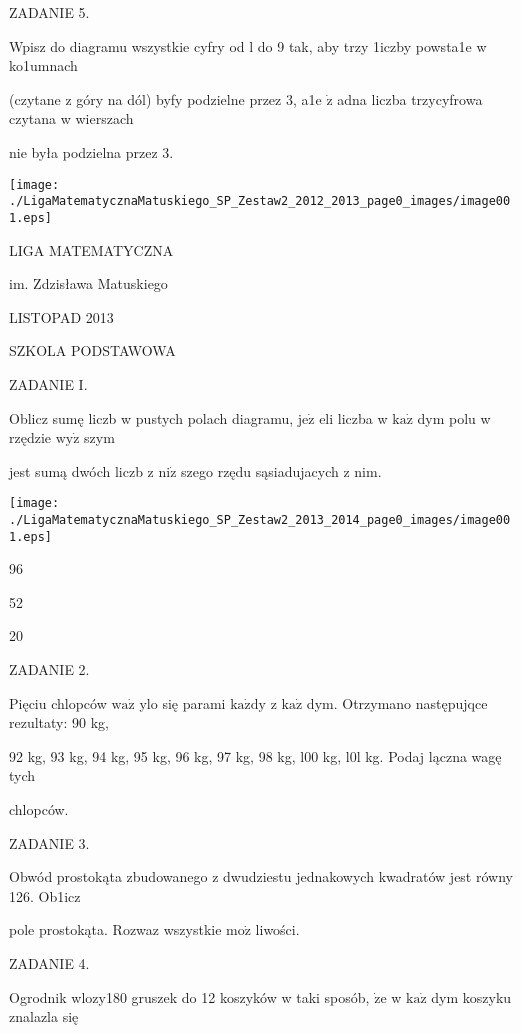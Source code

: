 \documentclass[a4paper,12pt]{article}
\begin{document}
ZADANIE 5.

Wpisz do diagramu wszystkie cyfry od l do 9 tak, aby trzy 1iczby powsta1e w ko1umnach

(czytane z góry na dól) byfy podzielne przez 3, a1e $\dot{\mathrm{z}}$ adna liczba trzycyfrowa czytana w wierszach

nie była podzielna przez 3.
\begin{center}
\texttt{[image: ./LigaMatematycznaMatuskiego\_SP\_Zestaw2\_2012\_2013\_page0\_images/image001.eps]}
\end{center}





LIGA MATEMATYCZNA

im. Zdzisława Matuskiego

LISTOPAD 2013

SZKOLA PODSTAWOWA

ZADANIE I.

Oblicz sumę liczb w pustych polach diagramu, $\mathrm{j}\mathrm{e}\dot{\mathrm{z}}$ eli liczba w $\mathrm{k}\mathrm{a}\dot{\mathrm{z}}$ dym polu w rzędzie $\mathrm{w}\mathrm{y}\dot{\mathrm{z}}$ szym

jest sumą dwóch liczb z $\mathrm{n}\mathrm{i}\dot{\mathrm{z}}$ szego rzędu sąsiadujacych z nim.
\begin{center}
\texttt{[image: ./LigaMatematycznaMatuskiego\_SP\_Zestaw2\_2013\_2014\_page0\_images/image001.eps]}
\end{center}
96

52

20

ZADANIE 2.

Pięciu chlopców $\mathrm{w}\mathrm{a}\dot{\mathrm{z}}$ ylo się parami $\mathrm{k}\mathrm{a}\dot{\mathrm{z}}\mathrm{d}\mathrm{y}$ z $\mathrm{k}\mathrm{a}\dot{\mathrm{z}}$ dym. Otrzymano następujqce rezultaty: 90 kg,

92 kg, 93 kg, 94 kg, 95 kg, 96 kg, 97 kg, 98 kg, l00 kg, l0l kg. Podaj lączna wagę tych

chlopców.

ZADANIE 3.

Obwód prostokąta zbudowanego z dwudziestu jednakowych kwadratów jest równy 126. Ob1icz

pole prostokąta. Rozwaz wszystkie $\mathrm{m}\mathrm{o}\dot{\mathrm{z}}$ liwości.

ZADANIE 4.

Ogrodnik wlozy180 gruszek do 12 koszyków w taki sposób, $\dot{\mathrm{z}}\mathrm{e}$ w $\mathrm{k}\mathrm{a}\dot{\mathrm{z}}$ dym koszyku znalazla się
\end{document}
